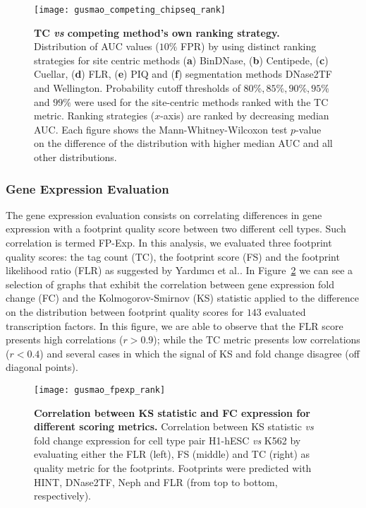 \begin{figure}[h!]
\centering
\texttt{[image: gusmao\_competing\_chipseq\_rank]}
\caption[TC \emph{vs} competing method's own ranking strategy]{\textbf{TC \emph{vs} competing method's own ranking strategy.} Distribution of AUC values ($10\%$ FPR) by using distinct ranking strategies for site centric methods (\textbf{a}) BinDNase, (\textbf{b}) Centipede, (\textbf{c}) Cuellar, (\textbf{d}) FLR, (\textbf{e}) PIQ and (\textbf{f}) segmentation methods DNase2TF and Wellington. Probability cutoff thresholds of $80\%, 85\%, 90\%, 95\% $ and $99\%$ were used for the site-centric methods ranked with the TC metric. Ranking strategies ($x$-axis) are ranked by decreasing median AUC. Each figure shows the Mann-Whitney-Wilcoxon test $p$-value on the difference of the distribution with higher median AUC and all other distributions.}
\label{fig:gusmao_competing_chipseq_rank}
\end{figure}

\subsubsection{Gene Expression Evaluation}
\label{sec:frs.gene.expression.evaluation}

The gene expression evaluation consists on correlating differences in gene expression with a footprint quality score between two different cell types. Such correlation is termed FP-Exp. In this analysis, we evaluated three footprint quality scores: the tag count (TC), the footprint score (FS) and the footprint likelihood ratio (FLR) as suggested by Yard{\i}mc{\i} et al.\cite{yardimci2014}. In Figure~\ref{fig:gusmao_fpexp_rank} we can see a selection of graphs that exhibit the correlation between gene expression fold change (FC) and the Kolmogorov-Smirnov (KS) statistic applied to the difference on the distribution between footprint quality scores for $143$ evaluated transcription factors. In this figure, we are able to observe that the FLR score presents high correlations ($r > 0.9$); while the TC metric presents low correlations ($r < 0.4$) and several cases in which the signal of KS and fold change disagree (off diagonal points).

\begin{figure}[h!]
\centering
\texttt{[image: gusmao\_fpexp\_rank]}
\caption[Correlation between KS statistic and FC expression for different scoring metrics]{\textbf{Correlation between KS statistic and FC expression for different scoring metrics.} Correlation between KS statistic \textit{vs} fold change expression for cell type pair H1-hESC \textit{vs} K562 by evaluating either the FLR (left), FS (middle) and TC (right) as quality metric for the footprints. Footprints were predicted with HINT, DNase2TF, Neph and FLR (from top to bottom, respectively).}
\label{fig:gusmao_fpexp_rank}
\end{figure}

